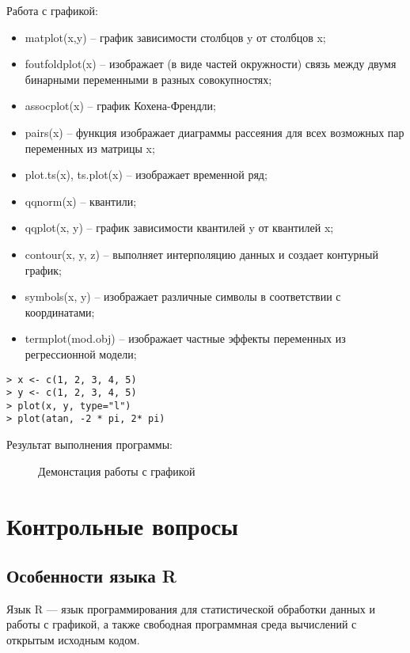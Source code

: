 \documentclass[a4paper,14pt]{extarticle}
\begin{document}
Работа с графикой:
\begin{itemize}
    \item matplot(x,y) – график зависимости столбцов y от столбцов x;
    \item foutfoldplot(x) – изображает (в виде частей окружности) связь между
          двумя бинарными переменными в разных совокупностях;
    \item assocplot(x) – график Кохена-Френдли;
    \item pairs(x) – функция изображает диаграммы рассеяния для всех возможных
          пар переменных из матрицы x;
    \item plot.ts(x), ts.plot(x) – изображает временной ряд;
    \item qqnorm(x) – квантили;
    \item qqplot(x, y) – график зависимости квантилей y от квантилей x;
    \item contour(x, y, z) – выполняет интерполяцию данных и создает контурный
          график;
    \item symbols(x, y) – изображает различные символы в соответствии с
          координатами;
    \item termplot(mod.obj) – изображает частные эффекты переменных из
          регрессионной модели;
\end{itemize}

\begin{lstlisting}
> x <- c(1, 2, 3, 4, 5)
> y <- c(1, 2, 3, 4, 5)
> plot(x, y, type="l")
> plot(atan, -2 * pi, 2* pi)
\end{lstlisting}

Результат выполнения программы:
\begin{figure}[H]
    \centering
    \subfloat[y = x]{\texttt{[image: y=x]}}
    \hspace{.15\linewidth}
    \caption{Демонстация работы с графикой}
\end{figure}

\section{Контрольные вопросы}

\subsection{Особенности языка R}
Язык R  — язык программирования для статистической обработки данных и работы
с графикой, а также свободная программная среда вычислений с открытым
исходным кодом.
\end{document}
